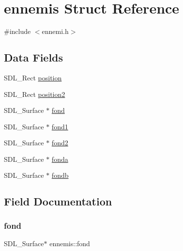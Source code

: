 \hypertarget{structennemis}{}\section{ennemis Struct Reference}
\label{structennemis}


{\ttfamily \#include $<$ennemi.\+h$>$}

\subsection*{Data Fields}
\begin{DoxyCompactItemize}
\item 
S\+D\+L\+\_\+\+Rect \hyperlink{structennemis_a3e8a9864c41c217f29e8fa94c3323414}{position}
\item 
S\+D\+L\+\_\+\+Rect \hyperlink{structennemis_a25ac4c539f00f1d72a98164bbbe17f18}{position2}
\item 
S\+D\+L\+\_\+\+Surface $\ast$ \hyperlink{structennemis_a12545f1dec3d4c2f47ea779e08a832bd}{fond}
\item 
S\+D\+L\+\_\+\+Surface $\ast$ \hyperlink{structennemis_ad566435b5e86ee846b20ca8c261a9d9f}{fond1}
\item 
S\+D\+L\+\_\+\+Surface $\ast$ \hyperlink{structennemis_a7cdce135302cefeedce69637c561ca87}{fond2}
\item 
S\+D\+L\+\_\+\+Surface $\ast$ \hyperlink{structennemis_a0656bf1f2a05bd147d373d7eaa3f4285}{fonda}
\item 
S\+D\+L\+\_\+\+Surface $\ast$ \hyperlink{structennemis_aaef083b31ba478455bcbd16ed7235efb}{fondb}
\end{DoxyCompactItemize}


\subsection{Field Documentation}
\mbox{\label{structennemis_a12545f1dec3d4c2f47ea779e08a832bd}} 
\subsubsection{\texorpdfstring{fond}{fond}}
{\footnotesize\ttfamily S\+D\+L\+\_\+\+Surface$\ast$ ennemis\+::fond}

\mbox{\label{structennemis_ad566435b5e86ee846b20ca8c261a9d9f}} 
